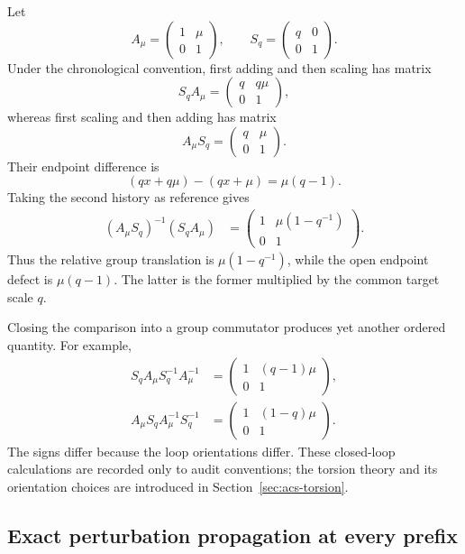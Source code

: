 Let
\[
  A_\mu=
  \begin{pmatrix}1&\mu\\0&1\end{pmatrix},
  \qquad
  S_q=
  \begin{pmatrix}q&0\\0&1\end{pmatrix}.
\]
Under the chronological convention, first adding and then scaling has matrix
\[
  S_qA_\mu
  =\begin{pmatrix}q&q\mu\\0&1\end{pmatrix},
\]
whereas first scaling and then adding has matrix
\[
  A_\mu S_q
  =\begin{pmatrix}q&\mu\\0&1\end{pmatrix}.
\]
Their endpoint difference is
\[
  (qx+q\mu)-(qx+\mu)=\mu(q-1).
\]
Taking the second history as reference gives
\begin{align*}
  (A_\mu S_q)^{-1}(S_qA_\mu)
  &=\begin{pmatrix}1&\mu(1-q^{-1})\\0&1\end{pmatrix}.
\end{align*}
Thus the relative group translation is $\mu(1-q^{-1})$, while the open
endpoint defect is $\mu(q-1)$.  The latter is the former multiplied by the
common target scale $q$.

Closing the comparison into a group commutator produces yet another ordered
quantity.  For example,
\begin{align*}
  S_qA_\mu S_q^{-1}A_\mu^{-1}
  &=\begin{pmatrix}1&(q-1)\mu\\0&1\end{pmatrix},\\
  A_\mu S_qA_\mu^{-1}S_q^{-1}
  &=\begin{pmatrix}1&(1-q)\mu\\0&1\end{pmatrix}.
\end{align*}
The signs differ because the loop orientations differ.  These closed-loop
calculations are recorded only to audit conventions; the torsion theory and
its orientation choices are introduced in Section~\ref{sec:acs-torsion}.

\subsection{Exact perturbation propagation at every prefix}

